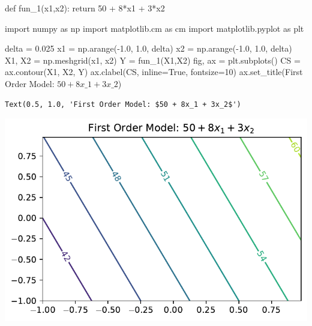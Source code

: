 \documentclass[
  letterpaper,
  DIV=11,
  numbers=noendperiod]{scrreprt}
\newenvironment{Shaded}{\begin{snugshade}}{\end{snugshade}}
\newcommand{\ControlFlowTok}[1]{\textcolor[rgb]{0.00,0.23,0.31}{#1}}
\newcommand{\DecValTok}[1]{\textcolor[rgb]{0.68,0.00,0.00}{#1}}
\newcommand{\FloatTok}[1]{\textcolor[rgb]{0.68,0.00,0.00}{#1}}
\newcommand{\ImportTok}[1]{\textcolor[rgb]{0.00,0.46,0.62}{#1}}
\newcommand{\KeywordTok}[1]{\textcolor[rgb]{0.00,0.23,0.31}{#1}}
\newcommand{\NormalTok}[1]{\textcolor[rgb]{0.00,0.23,0.31}{#1}}
\newcommand{\OperatorTok}[1]{\textcolor[rgb]{0.37,0.37,0.37}{#1}}
\newcommand{\StringTok}[1]{\textcolor[rgb]{0.13,0.47,0.30}{#1}}
\newcommand{\VariableTok}[1]{\textcolor[rgb]{0.07,0.07,0.07}{#1}}
\begin{document}
\begin{Shaded}
\begin{Highlighting}[]
\KeywordTok{def}\NormalTok{ fun\_1(x1,x2):}
    \ControlFlowTok{return} \DecValTok{50} \OperatorTok{+} \DecValTok{8}\OperatorTok{*}\NormalTok{x1 }\OperatorTok{+} \DecValTok{3}\OperatorTok{*}\NormalTok{x2}
\end{Highlighting}
\end{Shaded}

\begin{Shaded}
\begin{Highlighting}[]
\ImportTok{import}\NormalTok{ numpy }\ImportTok{as}\NormalTok{ np}
\ImportTok{import}\NormalTok{ matplotlib.cm }\ImportTok{as}\NormalTok{ cm}
\ImportTok{import}\NormalTok{ matplotlib.pyplot }\ImportTok{as}\NormalTok{ plt}

\NormalTok{delta }\OperatorTok{=} \FloatTok{0.025}
\NormalTok{x1 }\OperatorTok{=}\NormalTok{ np.arange(}\OperatorTok{{-}}\FloatTok{1.0}\NormalTok{, }\FloatTok{1.0}\NormalTok{, delta)}
\NormalTok{x2 }\OperatorTok{=}\NormalTok{ np.arange(}\OperatorTok{{-}}\FloatTok{1.0}\NormalTok{, }\FloatTok{1.0}\NormalTok{, delta)}
\NormalTok{X1, X2 }\OperatorTok{=}\NormalTok{ np.meshgrid(x1, x2)}
\NormalTok{Y }\OperatorTok{=}\NormalTok{ fun\_1(X1,X2)}
\NormalTok{fig, ax }\OperatorTok{=}\NormalTok{ plt.subplots()}
\NormalTok{CS }\OperatorTok{=}\NormalTok{ ax.contour(X1, X2, Y)}
\NormalTok{ax.clabel(CS, inline}\OperatorTok{=}\VariableTok{True}\NormalTok{, fontsize}\OperatorTok{=}\DecValTok{10}\NormalTok{)}
\NormalTok{ax.set\_title(}\StringTok{\textquotesingle{}First Order Model: $50 + 8x\_1 + 3x\_2$\textquotesingle{}}\NormalTok{)}
\end{Highlighting}
\end{Shaded}

\begin{verbatim}
Text(0.5, 1.0, 'First Order Model: $50 + 8x_1 + 3x_2$')
\end{verbatim}

\includegraphics{005_num_rsm_files/figure-pdf/cell-5-output-2.pdf}
\end{document}
